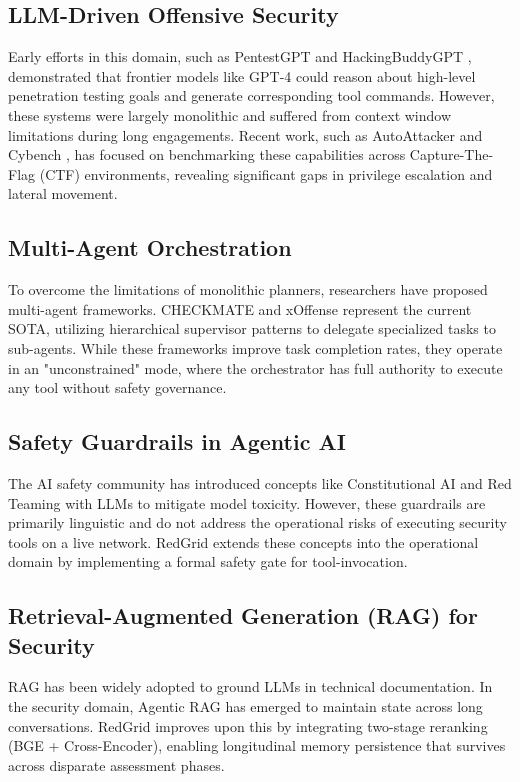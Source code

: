 \documentclass[conference]{IEEEtran}
\begin{document}
\subsection{LLM-Driven Offensive Security}
Early efforts in this domain, such as PentestGPT \cite{pentestgpt} and HackingBuddyGPT \cite{hackingbuddygpt}, demonstrated that frontier models like GPT-4 could reason about high-level penetration testing goals and generate corresponding tool commands. However, these systems were largely monolithic and suffered from context window limitations during long engagements. Recent work, such as AutoAttacker \cite{autoattacker} and Cybench \cite{cybench}, has focused on benchmarking these capabilities across Capture-The-Flag (CTF) environments, revealing significant gaps in privilege escalation and lateral movement.

\subsection{Multi-Agent Orchestration}
To overcome the limitations of monolithic planners, researchers have proposed multi-agent frameworks. CHECKMATE \cite{checkmate2025} and xOffense \cite{xoffense2025} represent the current SOTA, utilizing hierarchical supervisor patterns to delegate specialized tasks to sub-agents. While these frameworks improve task completion rates, they operate in an "unconstrained" mode, where the orchestrator has full authority to execute any tool without safety governance.

\subsection{Safety Guardrails in Agentic AI}
The AI safety community has introduced concepts like Constitutional AI \cite{constitutionalai} and Red Teaming with LLMs \cite{perez2022red} to mitigate model toxicity. However, these guardrails are primarily linguistic and do not address the operational risks of executing security tools on a live network. RedGrid extends these concepts into the operational domain by implementing a formal safety gate for tool-invocation.

\subsection{Retrieval-Augmented Generation (RAG) for Security}
RAG \cite{rag} has been widely adopted to ground LLMs in technical documentation. In the security domain, Agentic RAG \cite{selfrag} has emerged to maintain state across long conversations. RedGrid improves upon this by integrating two-stage reranking (BGE + Cross-Encoder), enabling longitudinal memory persistence that survives across disparate assessment phases.
\end{document}
